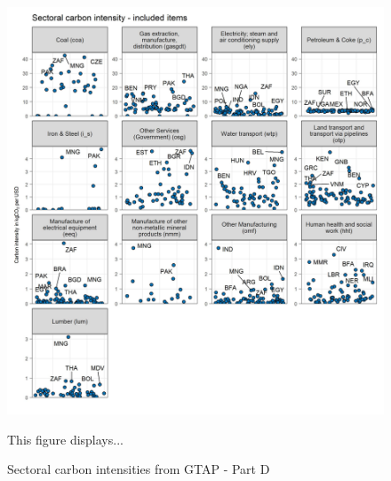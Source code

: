 \documentclass[12pt, a4paper]{article}
\newenvironment{subcaption}
{\strut
\vspace{-5pt}
\begin{minipage}[b]{0.9\textwidth}
  \hspace*{-\parindent}
  \footnotesize}
 {\end{minipage}}
\begin{document}
\begin{figure}[ht!]
  \centering
  \caption{Sectoral carbon intensities from GTAP - Part D} \label{fig:B4}
  \includegraphics{Analysis_Carbon_Intensities_GTAP/Figure_2.1.1_D}
  \begin{subcaption}
    This figure displays...
  \end{subcaption}

\end{figure}

\clearpage

\end{document}

